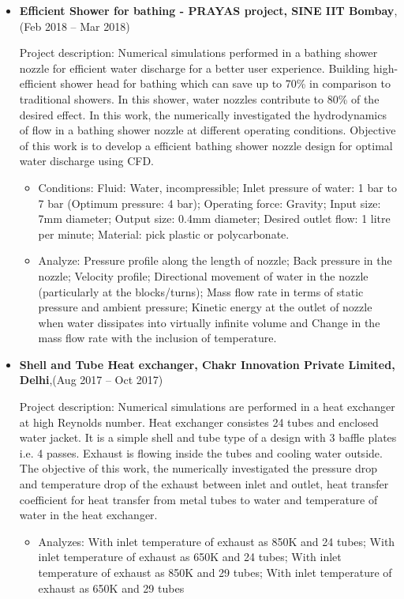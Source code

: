 \documentclass[a4paper,12pt]{article}
\begin{document}
\begin{itemize}

\item \textbf{Efficient Shower for bathing - PRAYAS project, SINE IIT Bombay},(Feb 2018 – Mar 2018)

{Project description: Numerical simulations performed in a bathing shower nozzle for efficient water discharge for a better user experience. Building high-efficient shower head for bathing which can save up to 70\% in comparison to traditional showers. In this shower, water nozzles contribute to 80\% of the desired effect.  In this work, the numerically investigated the hydrodynamics of flow in a bathing shower nozzle at different operating conditions. Objective of this work is to develop a efficient bathing shower nozzle design for optimal water discharge using CFD.} 
\begin{itemize}
  \item Conditions: Fluid: Water, incompressible; Inlet pressure of water: 1 bar to 7 bar (Optimum pressure: 4 bar); Operating force: Gravity; Input size: 7mm diameter; Output size: 0.4mm diameter; Desired outlet flow: 1 litre per minute; Material: pick plastic or polycarbonate.
  \item Analyze: Pressure profile along the length of nozzle; Back pressure in the nozzle; Velocity profile; Directional movement of water in the nozzle (particularly at the blocks/turns); Mass flow rate in terms of static pressure and ambient pressure; Kinetic energy at the outlet of nozzle when water dissipates into virtually infinite volume and Change in the mass flow rate with the inclusion of temperature.
\end{itemize}

\item \textbf{Shell and Tube Heat exchanger, Chakr Innovation Private Limited, Delhi},(Aug 2017 – Oct 2017)

{Project description: Numerical simulations are performed in a heat exchanger at high Reynolds number. Heat exchanger consistes 24 tubes and enclosed water jacket. It is a simple shell and tube type of a design with 3 baffle plates i.e. 4 passes. Exhaust is flowing inside the tubes and cooling water outside. The objective of this work, the numerically investigated the pressure drop and temperature drop of the exhaust between inlet and outlet, heat transfer coefficient for heat transfer from metal tubes to water and temperature of water in the heat exchanger.} 
\begin{itemize}
  \item Analyzes: With inlet temperature of exhaust as 850K and 24 tubes; With inlet temperature of exhaust as 650K and 24 tubes; With inlet temperature of exhaust as 850K and 29 tubes; With inlet temperature of exhaust as 650K and 29 tubes 
\end{itemize}



\end{itemize}
\end{document}
